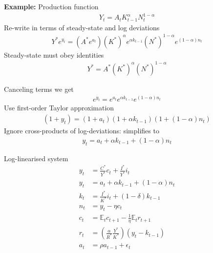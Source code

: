 \documentclass{beamer}
\begin{document}
\begin{frame}
  \textbf{Example:} Production function
  \begin{align}
    Y_t=A_tK^{\alpha}_{t-1}N^{1-\alpha}_t 
  \end{align}
  \medskip
  Re-write in terms of steady-state and log deviations
  \begin{align} 
     Y^*e^{y_t} = (A^* e^{a_t}) (K^*)^{\alpha}e^{\alpha k_{t-1}} (N^*)^{1-\alpha}e^{(1-\alpha)n_t}
  \end{align}
  \medskip
  Steady-state must obey identities
  \begin{align} 
    Y^* = A^* (K^*)^{\alpha} (N^*)^{1-\alpha} 
  \end{align}
\end{frame}

\begin{frame}
  Canceling terms we get 
  \begin{align}
    e^{y_t}=e^{a_t}e^{\alpha k_{t-1}}e^{(1-\alpha)n_t} 
  \end{align}
  \medskip
  Use first-order Taylor approximation
\begin{align}
  (1+y_t)=(1+a_t)(1+\alpha k_{t-1})(1+(1-\alpha)n_t)
\end{align}
\medskip
Ignore cross-products of log-deviations: simplifies to
 \begin{align} 
   y_t=a_t+\alpha k_{t-1} + (1-\alpha)n_t 
\end{align}
\end{frame}


\begin{frame}
  Log-linearised system
  \begin{align*}
  y_t &= \frac{C^*}{Y^*}c_t + \frac{I^*}{Y^*}i_t\\
  y_t &= a_t + \alpha k_{t-1} + (1-\alpha)n_t\\
  k_t &= \frac{I^*}{K^*}i_t + (1-\delta)k_{t-1}\\
  n_t &= y_t-\eta c_t\\
  c_t &= \mathbb{E}_tc_{t+1} - \frac{1}{\eta}\mathbb{E}_t r_{t+1}\\
  r_t &= \left(\frac{\alpha}{R^*}\frac{Y^*}{K^*} \right)(y_t-k_{t-1})\\
  a_t &= \rho a_{t-1} + \epsilon_t
 \end{align*}
\end{frame}
\end{document}
